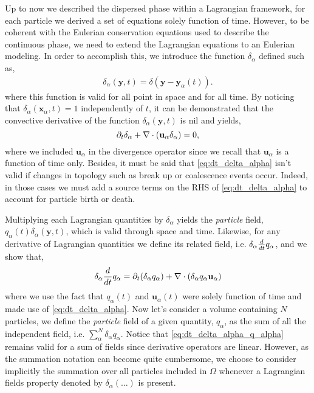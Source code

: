 Up to now we described the dispersed phase within a Lagrangian framework, for each particle we derived a set of equations solely function of time.
However, to be coherent with the Eulerian conservation equations used to describe the continuous phase, we need to extend the Lagrangian equations to an Eulerian modeling. 
In order to accomplish this, we introduce the function $\delta_\alpha$ defined such as, 
\begin{align}
    \delta_\alpha(\textbf{y},t) = \delta(\textbf{y}-\textbf{y}_\alpha(t)).
    \label{eq:delta_alpha}
\end{align}
where this function is valid for all point in space and for all time\citep[Chapter 2]{morel2015mathematical}. 
By noticing that $\delta_\alpha(\textbf{x}_\alpha,t) = 1$ independently of $t$, it can be demonstrated that the convective derivative of the function $\delta_\alpha(\textbf{y},t)$ is nil and yields, 
\begin{equation}
    \partial_t \delta_\alpha
    + \mathbf{\nabla} \cdot (\textbf{u}_\alpha  \delta_\alpha)
    =0,
    \label{eq:dt_delta_alpha}
\end{equation}
where we included $\textbf{u}_\alpha$ in the divergence operator since we recall that $\textbf{u}_\alpha$ is a function of time only.
Besides, it must be said that \ref{eq:dt_delta_alpha} isn't valid if changes in topology such as break up or coalescence events occur.
Indeed, in those cases we must add a source terms on the RHS of \ref{eq:dt_delta_alpha} to account for particle birth or death. 

Multiplying each Lagrangian quantities by $\delta_\alpha$ yields the \textit{particle} field, $q_\alpha(t)\delta_\alpha(\textbf{y},t)$, which is valid through space and time.
Likewise, for any derivative of Lagrangian quantities we define its related field, i.e. $\delta_\alpha \frac{d}{d t} q_\alpha$, and we show that,
\begin{equation}
    \delta_\alpha \frac{d}{d t} q_\alpha
    = \partial_t (\delta_\alpha q_\alpha)
    + \mathbf{\nabla} \cdot (\delta_\alpha q_\alpha \textbf{u}_\alpha)
    \label{eq:dt_delta_alpha_q_alpha}
\end{equation}
where we use the fact that $q_\alpha(t)$ and $\textbf{u}_\alpha(t)$ were solely function of time and made use of \ref{eq:dt_delta_alpha}.
Now let's consider a volume containing $N$ particles, we define the \textit{particle} field of a given quantity, $q_\alpha$, as the sum of all the independent field, i.e. $\sum_\alpha^N \delta_\alpha q_\alpha$.
Notice that \ref{eq:dt_delta_alpha_q_alpha} remains valid for a sum of fields since derivative operators are linear.
However, as the summation notation can become quite cumbersome, we choose to consider implicitly the summation over all particles included in $\Omega$ whenever a Lagrangian fields property denoted by $\delta_\alpha (\ldots)$ is present.

